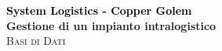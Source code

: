 \begin{titlepage}
    \selectfont 

    \vspace*{3cm}
    
    \centering
    {\Huge \textbf{\textcolor{black}{System Logistics - Copper Golem}}}\\[0.4cm]
    {\Large \textbf{Gestione di un impianto intralogistico}}\\[1.5cm]
    \textsc{\LARGE Basi di Dati}\\[0.5cm]
    \\[2cm]


\end{titlepage}
